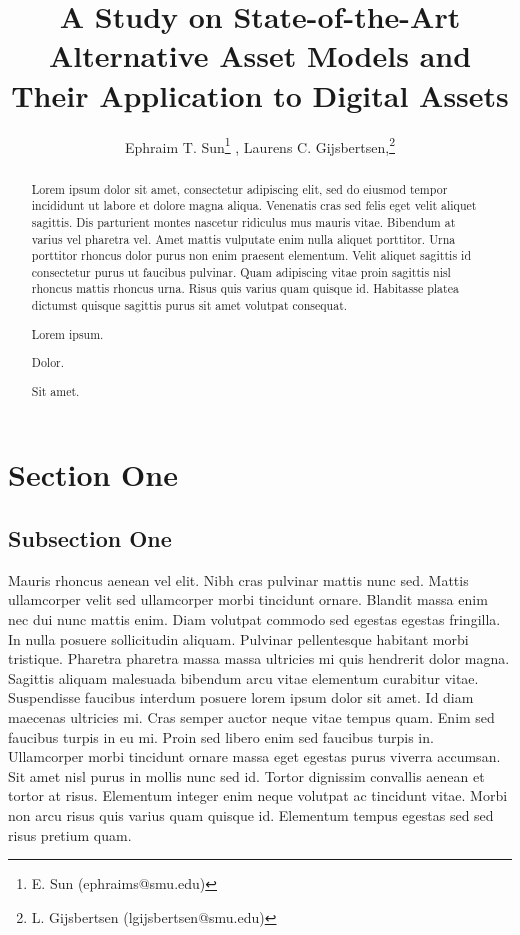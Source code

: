 \documentclass{ledger}
\title{A Study on State-of-the-Art Alternative Asset Models and Their Application to Digital Assets
}
\author{Ephraim T. Sun\thanks{E. Sun (ephraims@smu.edu)} , Laurens C. Gijsbertsen,\thanks{L. Gijsbertsen (lgijsbertsen@smu.edu)}}
\begin{document}
\maketitle

\thispagestyle{pagefirst}

\begin{abstract}
Lorem ipsum dolor sit amet, consectetur adipiscing elit, sed do eiusmod tempor incididunt ut labore et dolore magna aliqua. Venenatis cras sed felis eget velit aliquet sagittis. Dis parturient montes nascetur ridiculus mus mauris vitae. Bibendum at varius vel pharetra vel. Amet mattis vulputate enim nulla aliquet porttitor. Urna porttitor rhoncus dolor purus non enim praesent elementum. Velit aliquet sagittis id consectetur purus ut faucibus pulvinar. Quam adipiscing vitae proin sagittis nisl rhoncus mattis rhoncus urna.\cite{Nakamoto2008} Risus quis varius quam quisque id. Habitasse platea dictumst quisque sagittis purus sit amet volutpat consequat.

\begin{keywords}
\item Lorem ipsum.
\item Dolor.
\item Sit amet.
\end{keywords}
\end{abstract}

\section{Section One}
\subsection{Subsection One}
Mauris rhoncus aenean vel elit.\cite{Smith} Nibh cras pulvinar mattis nunc sed. Mattis ullamcorper velit sed ullamcorper morbi tincidunt ornare. Blandit massa enim nec dui nunc mattis enim. Diam volutpat commodo sed egestas egestas fringilla. In nulla posuere sollicitudin aliquam. Pulvinar pellentesque habitant morbi tristique. Pharetra pharetra massa massa ultricies mi quis hendrerit dolor magna. Sagittis aliquam malesuada bibendum arcu vitae elementum curabitur vitae. Suspendisse faucibus interdum posuere lorem ipsum dolor sit amet. Id diam maecenas ultricies mi. Cras semper auctor neque vitae tempus quam. Enim sed faucibus turpis in eu mi. Proin sed libero enim sed faucibus turpis in. Ullamcorper morbi tincidunt ornare massa eget egestas purus viverra accumsan. Sit amet nisl purus in mollis nunc sed id. Tortor dignissim convallis aenean et tortor at risus. Elementum integer enim neque volutpat ac tincidunt vitae. Morbi non arcu risus quis varius quam quisque id. Elementum tempus egestas sed sed risus pretium quam.
\end{document}
